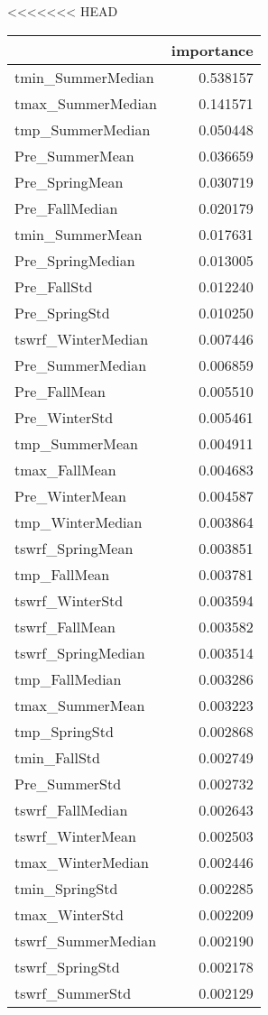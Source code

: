 <<<<<<< HEAD
\begin{tabular}{lr}
\toprule
 & importance \\
\midrule
tmin_SummerMedian & 0.538157 \\
tmax_SummerMedian & 0.141571 \\
tmp_SummerMedian & 0.050448 \\
Pre_SummerMean & 0.036659 \\
Pre_SpringMean & 0.030719 \\
Pre_FallMedian & 0.020179 \\
tmin_SummerMean & 0.017631 \\
Pre_SpringMedian & 0.013005 \\
Pre_FallStd & 0.012240 \\
Pre_SpringStd & 0.010250 \\
tswrf_WinterMedian & 0.007446 \\
Pre_SummerMedian & 0.006859 \\
Pre_FallMean & 0.005510 \\
Pre_WinterStd & 0.005461 \\
tmp_SummerMean & 0.004911 \\
tmax_FallMean & 0.004683 \\
Pre_WinterMean & 0.004587 \\
tmp_WinterMedian & 0.003864 \\
tswrf_SpringMean & 0.003851 \\
tmp_FallMean & 0.003781 \\
tswrf_WinterStd & 0.003594 \\
tswrf_FallMean & 0.003582 \\
tswrf_SpringMedian & 0.003514 \\
tmp_FallMedian & 0.003286 \\
tmax_SummerMean & 0.003223 \\
tmp_SpringStd & 0.002868 \\
tmin_FallStd & 0.002749 \\
Pre_SummerStd & 0.002732 \\
tswrf_FallMedian & 0.002643 \\
tswrf_WinterMean & 0.002503 \\
tmax_WinterMedian & 0.002446 \\
tmin_SpringStd & 0.002285 \\
tmax_WinterStd & 0.002209 \\
tswrf_SummerMedian & 0.002190 \\
tswrf_SpringStd & 0.002178 \\
tswrf_SummerStd & 0.002129 \\

\end{tabular}
